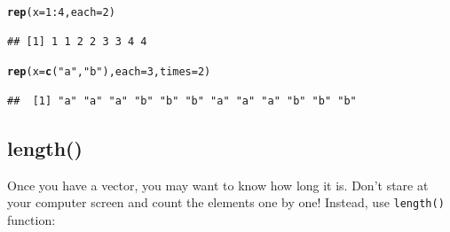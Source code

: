 \documentclass{tufte-book}\usepackage[]{graphicx}\usepackage[]{color}
\makeatletter
\newcommand{\hlnum}[1]{\textcolor[rgb]{0.686,0.059,0.569}{#1}}%
\newcommand{\hlstr}[1]{\textcolor[rgb]{0.192,0.494,0.8}{#1}}%
\newcommand{\hlopt}[1]{\textcolor[rgb]{0,0,0}{#1}}%
\newcommand{\hlstd}[1]{\textcolor[rgb]{0.345,0.345,0.345}{#1}}%
\newcommand{\hlkwc}[1]{\textcolor[rgb]{0.333,0.667,0.333}{#1}}%
\newcommand{\hlkwd}[1]{\textcolor[rgb]{0.737,0.353,0.396}{\textbf{#1}}}%
\newenvironment{kframe}{%
 \def\at@end@of@kframe{}%
 \ifinner\ifhmode%
  \def\at@end@of@kframe{\end{minipage}}%
  \begin{minipage}{\columnwidth}%
 \fi\fi%
 \def\FrameCommand##1{\hskip\@totalleftmargin \hskip-\fboxsep
 \colorbox{shadecolor}{##1}\hskip-\fboxsep
     \hskip-\linewidth \hskip-\@totalleftmargin \hskip\columnwidth}%
 \MakeFramed {\advance\hsize-\width
   \@totalleftmargin\z@ \linewidth\hsize
   \@setminipage}}%
 {\par\unskip\endMakeFramed%
 \at@end@of@kframe}
\newenvironment{knitrout}{}{} %
\makeatother
\begin{document}
\begin{knitrout}
\color{fgcolor}\begin{kframe}
\begin{alltt}
\hlkwd{rep}\hlstd{(}\hlkwc{x} \hlstd{=} \hlnum{1}\hlopt{:}\hlnum{4}\hlstd{,} \hlkwc{each} \hlstd{=} \hlnum{2}\hlstd{)}
\end{alltt}
\begin{verbatim}
## [1] 1 1 2 2 3 3 4 4
\end{verbatim}
\begin{alltt}
\hlkwd{rep}\hlstd{(}\hlkwc{x} \hlstd{=} \hlkwd{c}\hlstd{(}\hlstr{"a"}\hlstd{,} \hlstr{"b"}\hlstd{),} \hlkwc{each} \hlstd{=} \hlnum{3}\hlstd{,} \hlkwc{times} \hlstd{=} \hlnum{2}\hlstd{)}
\end{alltt}
\begin{verbatim}
##  [1] "a" "a" "a" "b" "b" "b" "a" "a" "a" "b" "b" "b"
\end{verbatim}
\end{kframe}
\end{knitrout}

\subsection{length()}


Once you have a vector, you may want to know how long it is. Don't stare at your computer screen and count the elements one by one! Instead, use \texttt{length()} function:
\end{document}
